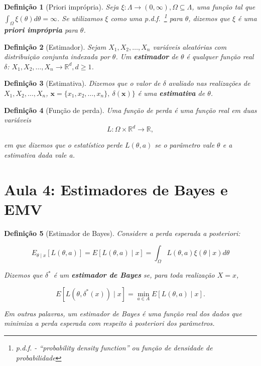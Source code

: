 \documentclass{article}
\newtheorem{definition}{Definição}
\begin{document}
\begin{definition}[Priori imprópria]
Seja $\xi : \Lambda \rightarrow (0, \infty), \Omega \subseteq \Lambda$, uma função tal que $\int_\Omega \xi(\theta) d \theta = \infty$. Se utilizamos $\xi$ como uma p.d.f.~\footnote{p.d.f. - ``probability density function'' ou função de densidade de probabilidade} para $\theta$, dizemos que $\xi$ é uma \textbf{priori imprópria} para $\theta$.
\end{definition}

\begin{definition}[Estimador]
Sejam $X_1, X_2, \ldots, X_n$ variáveis aleatórias com distribuição conjunta indexada por $\theta$. Um \textbf{estimador} de $\theta$ é qualquer função real $\delta$: $X_1, X_2, \ldots, X_n \rightarrow \mathbb{R}^d, d \geq 1$.
\end{definition}

\begin{definition}[Estimativa]
Dizemos que o valor de $\delta$ avaliado nas realizações de $X_1, X_2, \ldots, X_n$, $\textbf{x} = \{x_1, x_2, \ldots, x_n\}, \ \delta(\textbf{x})\}$ é uma \textbf{estimativa} de $\theta$.
\end{definition}

\begin{definition}[Função de perda]
Uma função de perda é uma função real em duas variáveis 
\begin{equation}
L: \Omega \times \mathbb{R}^d \rightarrow \mathbb{R},
\end{equation}

em que dizemos que o estatístico \textit{perde} $L(\theta, a)$ se o parâmetro vale $\theta$ e a estimativa dada vale a.
\end{definition}

\section*{Aula 4: Estimadores de Bayes e EMV}

\begin{definition}[Estimador de Bayes]
Considere a perda esperada a posteriori:

\begin{equation}
E_{\theta \mid x} [L(\theta, a)] = E[L(\theta, a) \mid x] = \int_\Omega L(\theta, a) \xi (\theta \mid x) d \theta
\end{equation}

Dizemos que $\delta^*$ é um \textbf{estimador de Bayes} se, para toda realização $X = x$,

\begin{equation}
E[L(\theta, \delta^*(x)) \mid x] = \min_{a \in A} E[L(\theta, a) \mid x].
\end{equation}

Em outras palavras, um estimador de Bayes é uma função real dos dados que minimiza a perda esperada com respeito à posteriori dos parâmetros.
\end{definition}
\end{document}
